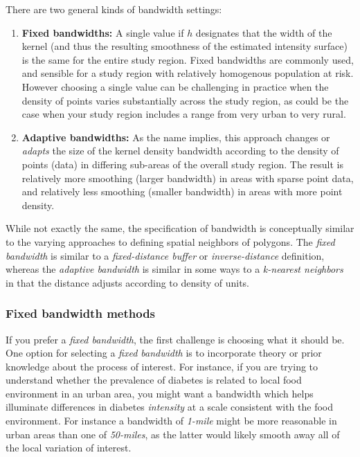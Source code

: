\documentclass[
]{book}
\providecommand{\tightlist}{%
  \setlength{\itemsep}{0pt}\setlength{\parskip}{0pt}}
\begin{document}
There are two general kinds of bandwidth settings:

\begin{enumerate}
\def\labelenumi{\arabic{enumi}.}
\tightlist
\item
  \textbf{Fixed bandwidths:} A single value if \(h\) designates that the width of the kernel (and thus the resulting smoothness of the estimated intensity surface) is the same for the entire study region. Fixed bandwidths are commonly used, and sensible for a study region with relatively homogenous population at risk. However choosing a single value can be challenging in practice when the density of points varies substantially across the study region, as could be the case when your study region includes a range from very urban to very rural.
\item
  \textbf{Adaptive bandwidths:} As the name implies, this approach changes or \emph{adapts} the size of the kernel density bandwidth according to the density of points (data) in differing sub-areas of the overall study region. The result is relatively more smoothing (larger bandwidth) in areas with sparse point data, and relatively less smoothing (smaller bandwidth) in areas with more point density.
\end{enumerate}

While not exactly the same, the specification of bandwidth is conceptually similar to the varying approaches to defining spatial neighbors of polygons. The \emph{fixed bandwidth} is similar to a \emph{fixed-distance buffer} or \emph{inverse-distance} definition, whereas the \emph{adaptive bandwidth} is similar in some ways to a \emph{k-nearest neighbors} in that the distance adjusts according to density of units.

\hypertarget{fixed-bandwidth-methods}{%
\subsubsection{Fixed bandwidth methods}\label{fixed-bandwidth-methods}}

If you prefer a \emph{fixed bandwidth}, the first challenge is choosing what it should be. One option for selecting a \emph{fixed bandwidth} is to incorporate theory or prior knowledge about the process of interest. For instance, if you are trying to understand whether the prevalence of diabetes is related to local food environment in an urban area, you might want a bandwidth which helps illuminate differences in diabetes \emph{intensity} at a scale consistent with the food environment. For instance a bandwidth of \emph{1-mile} might be more reasonable in urban areas than one of \emph{50-miles}, as the latter would likely smooth away all of the local variation of interest.
\end{document}
